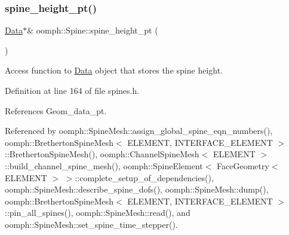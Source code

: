 \mbox{\label{classoomph_1_1Spine_ac34e4b12d9c1843611e42968ba5d90c7}} 
\subsubsection{\texorpdfstring{spine\+\_\+height\+\_\+pt()}{spine\_height\_pt()}\hspace{0.1cm}{\footnotesize\ttfamily [1/2]}}
{\footnotesize\ttfamily \hyperlink{classoomph_1_1Data}{Data}$\ast$\& oomph\+::\+Spine\+::spine\+\_\+height\+\_\+pt (\begin{DoxyParamCaption}{ }\end{DoxyParamCaption})\hspace{0.3cm}{\ttfamily [inline]}}



Access function to \hyperlink{classoomph_1_1Data}{Data} object that stores the spine height. 



Definition at line 164 of file spines.\+h.



References Geom\+\_\+data\+\_\+pt.



Referenced by oomph\+::\+Spine\+Mesh\+::assign\+\_\+global\+\_\+spine\+\_\+eqn\+\_\+numbers(), oomph\+::\+Bretherton\+Spine\+Mesh$<$ E\+L\+E\+M\+E\+N\+T, I\+N\+T\+E\+R\+F\+A\+C\+E\+\_\+\+E\+L\+E\+M\+E\+N\+T $>$\+::\+Bretherton\+Spine\+Mesh(), oomph\+::\+Channel\+Spine\+Mesh$<$ E\+L\+E\+M\+E\+N\+T $>$\+::build\+\_\+channel\+\_\+spine\+\_\+mesh(), oomph\+::\+Spine\+Element$<$ Face\+Geometry$<$ E\+L\+E\+M\+E\+N\+T $>$ $>$\+::complete\+\_\+setup\+\_\+of\+\_\+dependencies(), oomph\+::\+Spine\+Mesh\+::describe\+\_\+spine\+\_\+dofs(), oomph\+::\+Spine\+Mesh\+::dump(), oomph\+::\+Bretherton\+Spine\+Mesh$<$ E\+L\+E\+M\+E\+N\+T, I\+N\+T\+E\+R\+F\+A\+C\+E\+\_\+\+E\+L\+E\+M\+E\+N\+T $>$\+::pin\+\_\+all\+\_\+spines(), oomph\+::\+Spine\+Mesh\+::read(), and oomph\+::\+Spine\+Mesh\+::set\+\_\+spine\+\_\+time\+\_\+stepper().

\mbox{\label{classoomph_1_1Spine_a1253190f2780837bae5c68a3bd0a43a6}} 
